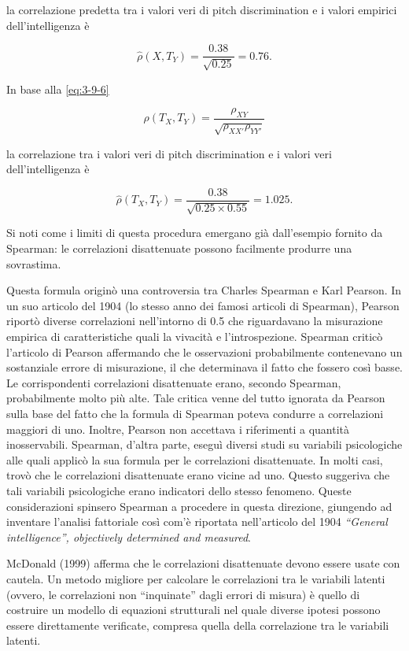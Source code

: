 \documentclass[
  11pt,
]{krantz}
\theoremstyle{definition}
\theoremstyle{definition}
\theoremstyle{definition}
\theoremstyle{definition}
\theoremstyle{remark}
\begin{document}
la correlazione predetta tra i valori veri di pitch discrimination e i valori empirici dell'intelligenza è

\[
\hat{\rho}(X, T_Y)  =\frac{0.38}{\sqrt{0.25}}=0.76.
\]

In base alla \eqref{eq:3-9-6}

\[\rho(T_X, T_Y)  = \frac{\rho_{XY}}{\sqrt{\rho_{XX'} \rho_{YY'}}}\]

la correlazione tra i valori veri di pitch discrimination e i valori veri dell'intelligenza è

\[\hat{\rho}(T_X, T_Y)  =\frac{0.38}{\sqrt{0.25 \times 0.55}}=1.025.\]

Si noti come i limiti di questa procedura emergano già dall'esempio fornito da Spearman: le correlazioni disattenuate possono facilmente produrre una sovrastima.

Questa formula originò una controversia tra Charles Spearman e Karl Pearson. In un suo articolo del 1904 (lo stesso anno dei famosi articoli di Spearman), Pearson riportò diverse correlazioni nell'intorno di 0.5 che riguardavano la misurazione empirica di caratteristiche quali la vivacità e l'introspezione. Spearman criticò l'articolo di Pearson affermando che le osservazioni probabilmente contenevano un sostanziale errore di misurazione, il che determinava il fatto che fossero così basse. Le corrispondenti correlazioni disattenuate erano, secondo Spearman, probabilmente molto più alte. Tale critica venne del tutto ignorata da Pearson sulla base del fatto che la formula di Spearman poteva condurre a correlazioni maggiori di uno. Inoltre, Pearson non accettava i riferimenti a quantità inosservabili. Spearman, d'altra parte, eseguì diversi studi su variabili psicologiche alle quali applicò la sua formula per le correlazioni disattenuate. In molti casi, trovò che le correlazioni disattenuate erano vicine ad uno. Questo suggeriva che tali variabili psicologiche erano indicatori dello stesso fenomeno. Queste considerazioni spinsero Spearman a procedere in questa direzione, giungendo ad inventare l'analisi fattoriale così com'è riportata nell'articolo del 1904 \emph{``General intelligence'', objectively determined and measured}.

McDonald (1999) afferma che le correlazioni disattenuate devono essere usate con cautela. Un metodo migliore per calcolare le correlazioni tra le variabili latenti (ovvero, le correlazioni non ``inquinate'' dagli errori di misura) è quello di costruire un modello di equazioni strutturali nel quale diverse ipotesi possono essere direttamente verificate, compresa quella della correlazione tra le variabili latenti.
\end{document}
